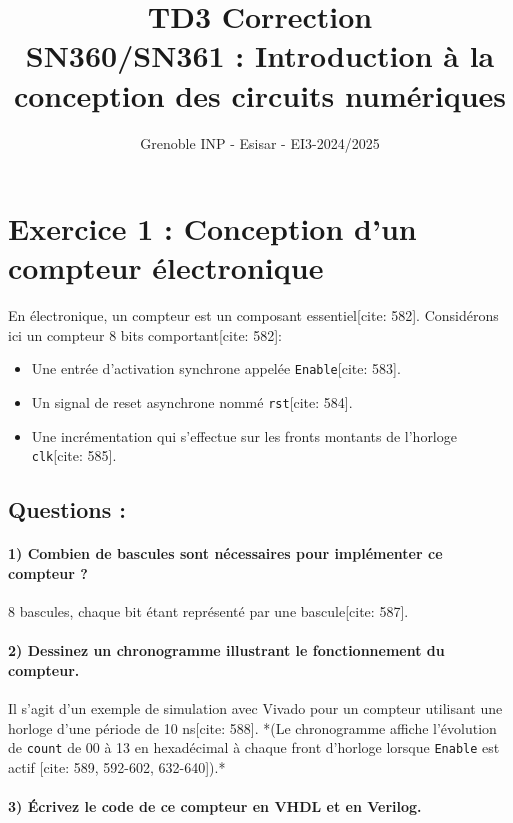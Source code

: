 \documentclass[11pt,a4paper]{article}
\title{TD3 Correction \\ \large SN360/SN361 : Introduction à la conception des circuits numériques}
\author{Grenoble INP - Esisar - EI3-2024/2025}
\date{}
\begin{document}
\maketitle

\section*{Exercice 1 : Conception d'un compteur électronique}

En électronique, un compteur est un composant essentiel[cite: 582]. Considérons ici un compteur 8 bits comportant[cite: 582]:
\begin{itemize}
    \item Une entrée d'activation synchrone appelée \texttt{Enable}[cite: 583].
    \item Un signal de reset asynchrone nommé \texttt{rst}[cite: 584].
    \item Une incrémentation qui s'effectue sur les fronts montants de l'horloge \texttt{clk}[cite: 585].
\end{itemize}

\subsection*{Questions :}

\paragraph{1) Combien de bascules sont nécessaires pour implémenter ce compteur ?}
8 bascules, chaque bit étant représenté par une bascule[cite: 587].

\paragraph{2) Dessinez un chronogramme illustrant le fonctionnement du compteur.}
Il s'agit d'un exemple de simulation avec Vivado pour un compteur utilisant une horloge d'une période de 10 ns[cite: 588]. *(Le chronogramme affiche l'évolution de \texttt{count} de 00 à 13 en hexadécimal à chaque front d'horloge lorsque \texttt{Enable} est actif [cite: 589, 592-602, 632-640]).*

\paragraph{3) Écrivez le code de ce compteur en VHDL et en Verilog.}
\end{document}
